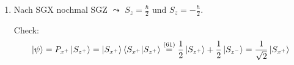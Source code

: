 \documentclass[a4paper]{scrartcl}
\newenvironment{aaufz}
	{\renewcommand{\labelenumi}{\alph{enumi})}
   \renewcommand{\labelenumii}{\alph{enumii})}
   \begin{enumerate}}
  {\end{enumerate}}
\begin{document}
{\begin{aaufz}
$\leadsto$ genau gleich viele $^{47}$Ag-Atome mit $S_x = \frac \hbar 2$ und $S_x = - \frac \hbar 2$ beobachtet.
\begin{align}
\braket{ S_{z^{\pm}} | S_x | S_{z^\mp}} & = \frac12 \left( \bra{ S_{x^+}} \mp \bra{ S_{x^-}} \right) S_x \left( \bra{ S_{x^+}} \pm \bra {S_{x^-}} \right) \notag \\
& = \frac12 \left[ \frac \hbar2 - \left( \frac \hbar2 \right) \right] ) = \frac \hbar 2 \\
\Longrightarrow s_x & = \frac \hbar 2 \begin{pmatrix} 0 & 1 \\ 1 & 0 \end{pmatrix} 
\end{align}
(65) entspricht
$$\braket{ S_{z^+} | S_x | S_{z^-}} = (1, 0) \frac\hbar2 \begin{pmatrix} 0 & 1 \\ 1 & 0 \end{pmatrix} \begin{pmatrix} 0 \\1 \end{pmatrix} = \frac \hbar 2.$$
\item Nach SGX nochmal SGZ $\leadsto$ $S_z = \frac\hbar2$ und $S_z = - \frac\hbar2$.

Check:
$$ \ket \psi = P_{x^+} \ket{ S_{z^+}} = \ket {S_{x^+}} \braket{ S_{x^+} | S_{z^+}} \stackrel{(61)}= \frac12 \ket{ S_{z^+}} + \frac12 \ket{ S_{z^-}} = \frac1{\sqrt 2} \ket{S_{x^+}}$$


\end{aaufz}}
\end{document}

